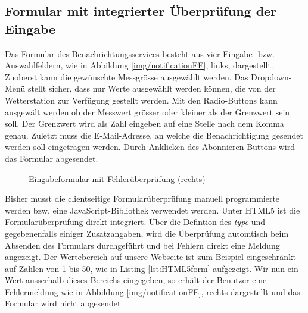 \subsection{Formular mit integrierter Überprüfung der Eingabe}
Das Formular des Benachrichtungsservices besteht aus vier Eingabe- bzw. Auswahlfeldern, wie in Abbildung \ref{img/notificationFE}, links, dargestellt. Zuoberst kann die gewünschte Messgrösse ausgewählt werden. Das Dropdown-Menü stellt sicher, dass nur Werte ausgewählt werden können, die von der Wetterstation zur Verfügung gestellt werden. Mit den Radio-Buttons kann ausgewält werden ob der Messwert grösser oder kleiner als der Grenzwert sein soll. Der Grenzwert wird als Zahl eingeben auf eine Stelle nach dem Komma genau. Zuletzt muss die E-Mail-Adresse, an welche die Benachrichtigung gesendet werden soll eingetragen werden. Durch Anklicken des Abonnieren-Buttons wird das Formular abgesendet.

\begin{figure}[h!]
	\centering
	\caption{Eingabeformular mit Fehlerüberprüfung (rechts)}
	\label{img:notificationFE}
\end{figure}

Bisher musst die clientseitige Formularüberprüfung manuell programmierte werden bzw. eine JavaScript-Bibliothek verwendet werden. Unter HTML5 ist die Formularüberprüfung direkt integriert. Über die Defintion des \textit{type} und gegebenenfalls einiger Zusatzangaben, wird die  Überprüfung automtisch beim Absenden des Formulars durchgeführt und bei Fehlern direkt eine Meldung angezeigt. Der Wertebereich auf unsere Webseite ist zum Beispiel eingeschränkt auf Zahlen von 1 bis 50, wie in Listing \ref{lst:HTML5form} aufgezeigt. Wir nun ein Wert ausserhalb dieses Bereichs eingegeben, so erhält der Benutzer eine Fehlermeldung wie in Abbildung \ref{img/notificationFE}, rechts dargestellt und das Formular wird nicht abgesendet.

